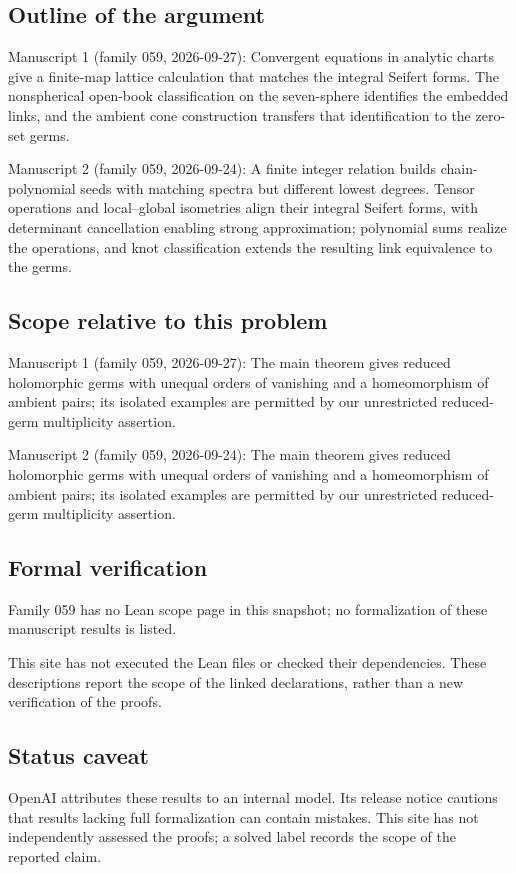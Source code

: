 \documentclass[11pt]{article}
\begin{document}
\subsection{Outline of the argument}
Manuscript 1 (family 059, 2026-09-27): Convergent equations in analytic charts give a finite-map lattice calculation that matches the integral Seifert forms. The nonspherical open-book classification on the seven-sphere identifies the embedded links, and the ambient cone construction transfers that identification to the zero-set germs.

Manuscript 2 (family 059, 2026-09-24): A finite integer relation builds chain-polynomial seeds with matching spectra but different lowest degrees. Tensor operations and local--global isometries align their integral Seifert forms, with determinant cancellation enabling strong approximation; polynomial sums realize the operations, and knot classification extends the resulting link equivalence to the germs.

\subsection{Scope relative to this problem}
Manuscript 1 (family 059, 2026-09-27): The main theorem gives reduced holomorphic germs with unequal orders of vanishing and a homeomorphism of ambient pairs; its isolated examples are permitted by our unrestricted reduced-germ multiplicity assertion.

Manuscript 2 (family 059, 2026-09-24): The main theorem gives reduced holomorphic germs with unequal orders of vanishing and a homeomorphism of ambient pairs; its isolated examples are permitted by our unrestricted reduced-germ multiplicity assertion.

\subsection{Formal verification}
Family 059 has no Lean scope page in this snapshot; no formalization of these manuscript results is listed.

This site has not executed the Lean files or checked their dependencies. These descriptions report the scope of the linked declarations, rather than a new verification of the proofs.

\subsection{Status caveat}
OpenAI attributes these results to an internal model. Its release notice cautions that results lacking full formalization can contain mistakes. This site has not independently assessed the proofs; a solved label records the scope of the reported claim.
\end{document}
